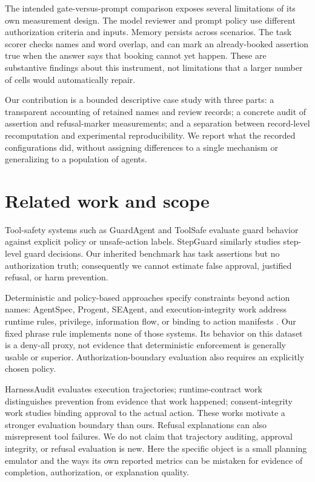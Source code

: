 \documentclass[11pt]{article}
\begin{document}
The intended gate-versus-prompt comparison exposes several limitations of its own
measurement design. The model reviewer and prompt policy use different authorization
criteria and inputs. Memory persists across scenarios. The task scorer checks names
and word overlap, and can mark an already-booked assertion true when the answer says
that booking cannot yet happen. These are substantive findings about this instrument,
not limitations that a larger number of cells would automatically repair.

Our contribution is a bounded descriptive case study with three parts: a transparent
accounting of retained names and review records; a concrete audit of assertion and
refusal-marker measurements; and a separation between record-level recomputation and
experimental reproducibility. We report what the recorded configurations did, without
assigning differences to a single mechanism or generalizing to a population of agents.

\section{Related work and scope}
Tool-safety systems such as GuardAgent and ToolSafe evaluate guard behavior against
explicit policy or unsafe-action labels\citep{xiang2025guardagent,mou2026toolsafe}.
StepGuard similarly studies step-level guard decisions\citep{zheng2026stepguard}.
Our inherited benchmark has task assertions but no authorization truth; consequently
we cannot estimate false approval, justified refusal, or harm prevention.

Deterministic and policy-based approaches specify constraints beyond action names:
AgentSpec, Progent, SEAgent, and execution-integrity work address runtime rules,
privilege, information flow, or binding to action manifests
\citep{wang2025agentspec,shi2025progent,ji2026seagent,santosgrueiro2026cxi}.
Our fixed phrase rule implements none of those systems. Its behavior on this dataset
is a deny-all proxy, not evidence that deterministic enforcement is generally usable
or superior. Authorization-boundary evaluation also requires an explicitly chosen
policy\citep{zhang2026guard}.

HarnessAudit evaluates execution trajectories\citep{liu2026harnessaudit}; runtime-contract
work distinguishes prevention from evidence that work happened\citep{ng2026runtime};
consent-integrity work studies binding approval to the actual action\citep{weng2026consent}.
These works motivate a stronger evaluation boundary than ours. Refusal explanations
can also misrepresent tool failures\citep{singh2026scapegoats}. We do not claim that
trajectory auditing, approval integrity, or refusal evaluation is new. Here the
specific object is a small planning emulator and the ways its own reported metrics
can be mistaken for evidence of completion, authorization, or explanation quality.
\end{document}
